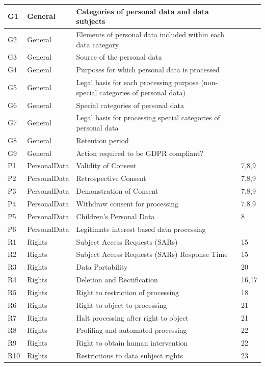 \begin{center}
\begin{tabularx}{\textwidth}{|l|l|X|l|}
G1 & General & Categories of personal data and data subjects &  \\ \hline
G2 & General & Elements of personal data included within each data category &  \\ \hline
G3 & General & Source of the personal data &  \\ \hline
G4 & General & Purposes for which personal data is processed &  \\ \hline
G5 & General & Legal basis for each processing purpose (non-special categories of personal data) &  \\ \hline
G6 & General & Special categories of personal data &  \\ \hline
G7 & General & Legal basis for processing special categories of personal data &  \\ \hline
G8 & General & Retention period &  \\ \hline
G9 & General & Action required to be GDPR compliant? &  \\ \hline
P1 & PersonalData & Validity of Consent & 7,8,9 \\ \hline
P2 & PersonalData & Retrospective Consent & 7,8,9 \\ \hline
P3 & PersonalData & Demonstration of Consent & 7,8,9 \\ \hline
P4 & PersonalData & Withdraw consent for processing & 7.8.9 \\ \hline
P5 & PersonalData & Children's Personal Data & 8 \\ \hline
P6 & PersonalData & Legitimate interest based data processing &  \\ \hline
R1 & Rights & Subject Access Requests (SARs) & 15 \\ \hline
R2 & Rights & Subject Access Requests (SARs) Response Time & 15 \\ \hline
R3 & Rights & Data Portability & 20 \\ \hline
R4 & Rights & Deletion and Rectification & 16,17 \\ \hline
R5 & Rights & Right to restriction of processing & 18 \\ \hline
R6 & Rights & Right to object to processing & 21 \\ \hline
R7 & Rights & Halt processing after right to object & 21 \\ \hline
R8 & Rights & Profiling and automated processing & 22 \\ \hline
R9 & Rights & Right to obtain human intervention & 22 \\ \hline
R10 & Rights & Restrictions to data subject rights & 23 \\ \hline

\end{tabularx}
\end{center}
